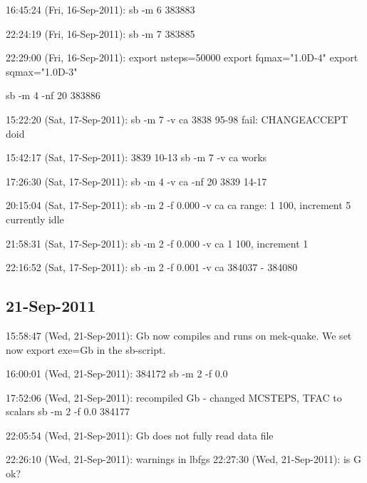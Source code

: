 16:45:24 (Fri, 16-Sep-2011):
	sb -m 6
	383883
	
22:24:19 (Fri, 16-Sep-2011):
	sb -m 7
	383885

22:29:00 (Fri, 16-Sep-2011):
	export nsteps=50000
	export fqmax="1.0D-4"
	export sqmax="1.0D-3"

	sb -m 4 -nf 20
	383886

15:22:20 (Sat, 17-Sep-2011):
	sb -m 7 -v ca
	3838 95-98
	fail: CHANGEACCEPT doid

15:42:17 (Sat, 17-Sep-2011):
	3839 10-13
	sb -m 7 -v ca
	works

17:26:30 (Sat, 17-Sep-2011):
	sb -m 4 -v ca -nf 20
	3839 14-17

20:15:04 (Sat, 17-Sep-2011):
	sb -m 2 -f 0.000 -v ca 
	ca range:
	1 100, increment 5
	currently idle

21:58:31 (Sat, 17-Sep-2011):
	sb -m 2 -f 0.000 -v ca
	1 100, increment 1

	
22:16:52 (Sat, 17-Sep-2011):
	sb -m 2 -f 0.001 -v ca
	384037 - 384080



\subsection{21-Sep-2011}


15:58:47 (Wed, 21-Sep-2011):
	Gb now compiles and runs on mek-quake. We
	set now 
		export exe=Gb 
	in the sb-script.
	
16:00:01 (Wed, 21-Sep-2011):
	384172
	sb -m 2 -f 0.0

17:52:06 (Wed, 21-Sep-2011):
	recompiled Gb - changed MCSTEPS, TFAC to scalars
	sb -m 2 -f 0.0
	384177

22:05:54 (Wed, 21-Sep-2011):
	Gb does not fully read data file
	
22:26:10 (Wed, 21-Sep-2011):
	warnings in lbfgs
22:27:30 (Wed, 21-Sep-2011):
	is G ok?
